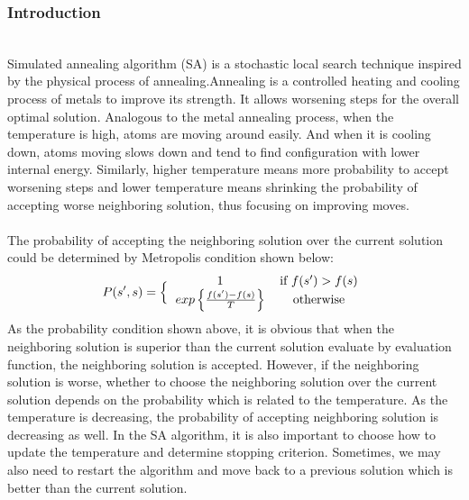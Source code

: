 \subsubsection{Introduction}
\hfill\\
Simulated annealing algorithm (SA) is a stochastic local search technique inspired by the physical process of annealing.Annealing is a controlled heating and cooling process of metals to improve its strength. It allows worsening steps for the overall optimal solution. Analogous to the metal annealing process, when the temperature is high, atoms are moving around easily. And when it is cooling down, atoms moving slows down and tend to find configuration with lower internal energy. Similarly, higher temperature means more probability to accept worsening steps and lower temperature means shrinking the probability of accepting worse neighboring solution, thus focusing on improving moves.\\
\hfill\\
The probability of accepting the neighboring solution over the current solution could be determined by Metropolis condition shown below: \\
\[P(s', s)=\Big\{
\begin{tabular}{cc}
1 & if \(f(s') > f(s)\)\\
\(exp \left\{
\frac{f(s')-f(s)}{T}
\right\}
\) & otherwise
\end{tabular}
\]
As the probability condition shown above, it is obvious that when the neighboring solution is superior than the current solution evaluate by evaluation function, the neighboring solution is accepted. However, if the neighboring solution is worse, whether to choose the neighboring solution over the current solution depends on the probability which is related to the temperature. As the temperature is decreasing, the probability of accepting neighboring solution is decreasing as well. 
In the SA algorithm, it is also important to choose how to update the temperature and determine stopping criterion. Sometimes, we may also need to restart the algorithm and move back to a previous solution which is better than the current solution. 


